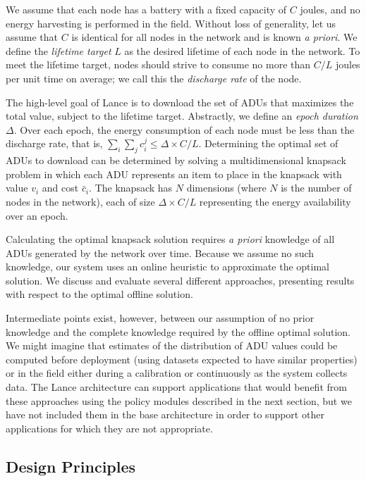 We assume that each node has a battery with a fixed capacity of $C$ joules,
and no energy harvesting is performed in the field. Without loss of
generality, let us assume that $C$ is identical for all nodes in the network
and is known \textit{a priori}. We define the \textit{lifetime target} $L$
as the desired lifetime of each node in the network. To meet the lifetime
target, nodes should strive to consume no more than $C/L$ joules per unit
time on average; we call this the \textit{discharge rate} of the node.

The high-level goal of Lance is to download the set of ADUs that maximizes
the total value, subject to the lifetime target. Abstractly, we define an
\textit{epoch duration} $\Delta$. Over each epoch, the energy consumption of
each node must be less than the discharge rate, that is, $\sum_i \sum_j c_i^j
\leq \Delta \times C/L$. Determining the optimal set of ADUs to download can
be determined by solving a multidimensional knapsack problem in which each
ADU represents an item to place in the knapsack with value $v_i$ and cost
$\bar{c}_i$. The knapsack has $N$ dimensions (where $N$ is the number of
nodes in the network), each of size $\Delta \times C/L$ representing the
energy availability over an epoch.

Calculating the optimal knapsack solution requires \textit{a priori}
knowledge of all ADUs generated by the network over time. Because we assume
no such knowledge, our system uses an online heuristic to approximate the
optimal solution. We discuss and evaluate several different approaches,
presenting results with respect to the optimal offline solution.

Intermediate points exist, however, between our assumption of no prior
knowledge and the complete knowledge required by the offline optimal
solution. We might imagine that estimates of the distribution of ADU values
could be computed before deployment (using datasets expected to have similar
properties) or in the field either during a calibration or continuously as
the system collects data. The Lance architecture can support applications
that would benefit from these approaches using the policy modules described
in the next section, but we have not included them in the base architecture
in order to support other applications for which they are not appropriate.

\subsection{Design Principles}

